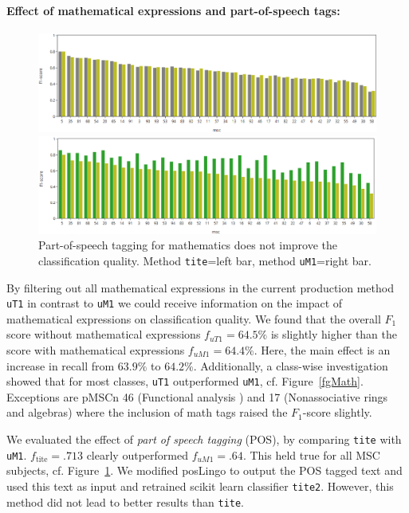 \paragraph{Effect of mathematical expressions and part-of-speech tags:}
\begin{figure}[t]
  \centering
  \includegraphics[width=\textwidth]{mathEncoding.png}
  \caption{Mathematical symbols in \texttt{title} and abstract \texttt{text} do not improve the classification quality. Method \texttt{uT1} =left bar; method \texttt{uM1}=right bar%
 }\label{fgMath}
  \includegraphics[width=\textwidth]{POSeffekt.png}
\caption{Part-of-speech tagging for mathematics does not improve the classification quality. Method \texttt{tite}=left bar, method \texttt{uM1}=right bar.}\label{fgPOS}
\end{figure}
By filtering out all mathematical expressions in the current production method \texttt{uT1} in contrast to \texttt{uM1} we could receive information on the impact of mathematical expressions on classification quality.
We found that the overall \(F_{1}\) score without mathematical expressions \(f_{uT1} = 64.5\%\) is slightly higher than the score with mathematical expressions \(f_{uM1} = 64.4\%.\)
Here, the main effect is an increase in recall from \(63.9\%\) to \(64.2\%.\)
Additionally, a class-wise investigation showed that for most classes, \texttt{uT1} outperformed \texttt{uM1}, cf. Figure~\ref{fgMath}.
Exceptions are pMSCn 46 (Functional analysis ) and 17 (Nonassociative rings and algebras) where the inclusion of math tags raised the \(F_{1}\)-score slightly.

We evaluated the effect of \emph{part of speech tagging} (POS), by comparing \texttt{tite} with \texttt{uM1}. \(f_{\mathrm{tite}} = .713\) clearly outperformed \(f_{uM1} = .64.\)
This held true for all MSC subjects, cf. Figure~\ref{fgPOS}.
We modified posLingo to output the POS tagged text and used this text as input and retrained scikit learn classifier \texttt{tite2}.
However, this method did not lead to better results than \texttt{tite}.

